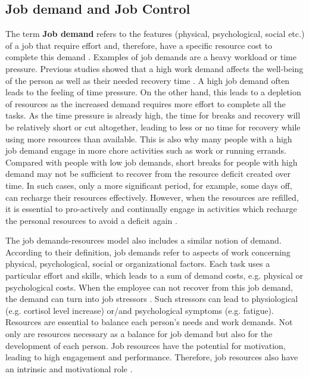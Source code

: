 \documentclass{hasel_thesis}
\begin{document}
\subsection{Job demand and Job Control} \label{job_control}
The term \textbf{Job demand} refers to the features (physical, psychological, social etc.) of a job that require effort and, therefore, have a specific resource cost to complete this demand \cite{Trougakos.2009}. Examples of job demands are a heavy workload or time pressure. Previous studies showed that a high work demand affects the well-being \cite{Sonnentag.2003} of the person as well as their needed recovery time \cite{Sonnentag.2006}. A high job demand often leads to the feeling of time pressure. On the other hand, this leads to a depletion of resources as the increased demand requires more effort to complete all the tasks. As the time pressure is already high, the time for breaks and recovery will be relatively short or cut altogether, leading to less or no time for recovery while using more resources than available. This is also why many people with a high job demand engage in more chore activities such as work or running errands.
Compared with people with low job demands, short breaks for people with high demand may not be sufficient to recover from the resource deficit created over time. In such cases, only a more significant period, for example, some days off, can recharge their resources effectively. However, when the resources are refilled, it is essential to pro-actively and continually engage in activities which recharge the personal resources to avoid a deficit again \cite{Trougakos.2009}.

The job demands-resources model \cite{BakkerA.B.DemeroutiE.DeBoerE.andSchaufeliW.B..2003b, DemeroutiE.BakkerA.B.NachreinerF.andSchaufeliW.B..2001a} also includes a similar notion of demand. According to their definition, job demands refer to aspects of work concerning physical, psychological, social or organizational factors. Each task uses a particular effort and skills, which leads to a sum of demand costs, e.g. physical or psychological costs. When the employee can not recover from this job demand, the demand can turn into job stressors \cite{Hobfoll.1998}. Such stressors can lead to physiological (e.g. cortisol level increase) or/and psychological symptoms (e.g. fatigue)\cite{Sonnentag.2022}. Resources are essential to balance each person's needs and work demands. Not only are resources necessary as a balance for job demand but also for the development of each person. Job resources have the potential for motivation, leading to high engagement and performance. Therefore, job resources also have an intrinsic and motivational role \cite{Bakker.2007}.
\end{document}

